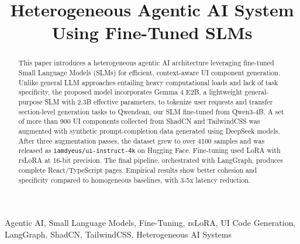 \documentclass[conference]{IEEEtran}
\begin{document}
\title{Heterogeneous Agentic AI System Using Fine-Tuned SLMs}

\author{
\and
{}
\and
{}
}
\maketitle

\begin{abstract}
This paper introduces a heterogeneous agentic AI architecture leveraging fine-tuned Small Language Models (SLMs) for efficient, context-aware UI component generation. Unlike general LLM approaches entailing heavy computational loads and lack of task specificity, the proposed model incorporates Gemma 4 E2B, a lightweight general-purpose SLM with 2.3B effective parameters, to tokenize user requests and transfer section-level generation tasks to Qwendean, our SLM fine-tuned from Qwen3-4B. A set of more than 900 UI components collected from ShadCN and TailwindCSS was augmented with synthetic prompt-completion data generated using DeepSeek models. After three augmentation passes, the dataset grew to over 4100 samples and was released as \texttt{iamdyeus/ui-instruct-4k} on Hugging Face. Fine-tuning used LoRA with rsLoRA at 16-bit precision. The final pipeline, orchestrated with LangGraph, produces complete React/TypeScript pages. Empirical results show better cohesion and specificity compared to homogeneous baselines, with 3-5x latency reduction.
\end{abstract}

\begin{IEEEkeywords}
Agentic AI, Small Language Models, Fine-Tuning, rsLoRA, UI Code Generation, LangGraph, ShadCN, TailwindCSS, Heterogeneous AI Systems
\end{IEEEkeywords}
\end{document}
